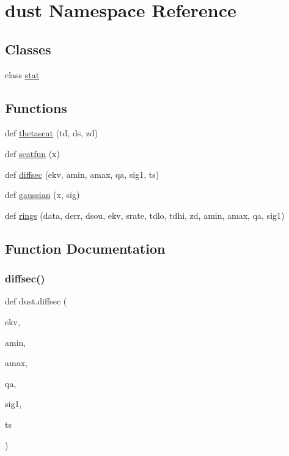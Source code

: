 \hypertarget{namespacedust}{}\section{dust Namespace Reference}
\label{namespacedust}
\subsection*{Classes}
\begin{DoxyCompactItemize}
\item 
class \hyperlink{classdust_1_1stat}{stat}
\end{DoxyCompactItemize}
\subsection*{Functions}
\begin{DoxyCompactItemize}
\item 
def \hyperlink{namespacedust_a68eab447dbb0803f6d41e20b4d6beab8}{thetascat} (td, ds, zd)
\item 
def \hyperlink{namespacedust_a5a6e0ad2f8852fc242c19d92a74c62c1}{scatfun} (x)
\item 
def \hyperlink{namespacedust_aed850e376802830a4581c6f21e14976d}{diffsec} (ekv, amin, amax, qa, sig1, ts)
\item 
def \hyperlink{namespacedust_a6dd89c33055349ee910884ef05992286}{gaussian} (x, sig)
\item 
def \hyperlink{namespacedust_a0147cc7beef4e9d9174a2ca9820361c7}{rings} (data, derr, dsou, ekv, srate, tdlo, tdhi, zd, amin, amax, qa, sig1)
\end{DoxyCompactItemize}


\subsection{Function Documentation}
\mbox{\label{namespacedust_aed850e376802830a4581c6f21e14976d}} 
\subsubsection{\texorpdfstring{diffsec()}{diffsec()}}
{\footnotesize\ttfamily def dust.\+diffsec (\begin{DoxyParamCaption}\item[{}]{ekv,  }\item[{}]{amin,  }\item[{}]{amax,  }\item[{}]{qa,  }\item[{}]{sig1,  }\item[{}]{ts }\end{DoxyParamCaption})}

